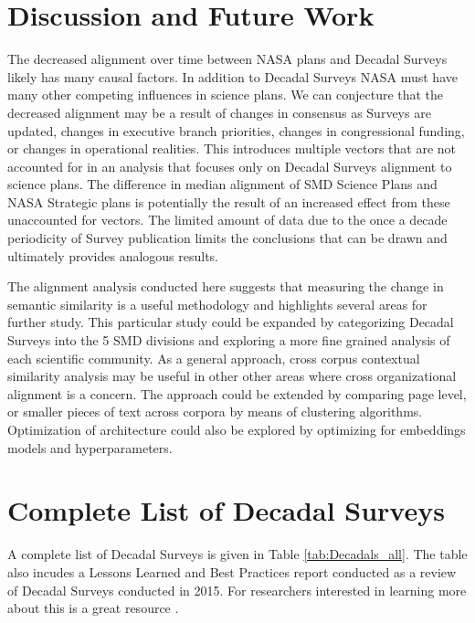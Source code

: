 \documentclass[preprint,12pt]{elsarticle}
\begin{document}
\section{Discussion and Future Work}
\label{discussion}

The decreased alignment over time between NASA plans and Decadal Surveys likely has many causal factors. In addition to Decadal Surveys NASA must have many other competing influences in science plans. We can conjecture that the decreased alignment may be a result of changes in consensus as Surveys are updated, changes in executive branch priorities, changes in congressional funding, or changes in operational realities. This introduces multiple vectors that are not accounted for in an analysis that focuses only on Decadal Surveys alignment to science plans. The difference in median alignment of SMD Science Plans and NASA Strategic plans is potentially the result of an increased effect from these unaccounted for vectors. The limited amount of data due to the once a decade periodicity of Survey publication limits the conclusions that can be drawn and ultimately provides analogous results. 

The alignment analysis conducted here suggests that measuring the change in semantic similarity is a useful methodology and highlights several areas for further study. This particular study could be expanded by categorizing Decadal Surveys into the 5 SMD divisions and exploring a more fine grained analysis of each scientific community. As a general approach, cross corpus contextual similarity analysis may be useful in other other areas where cross organizational alignment is a concern.  The approach could be extended by comparing page level, or smaller pieces of text across corpora by means of clustering algorithms. Optimization of architecture could also be explored by optimizing for embeddings models and hyperparameters.

\newpage 
\appendix
\section{Complete List of Decadal Surveys}
\label{app_Decadal_Surveys}
A complete list of Decadal Surveys is given in Table \ref{tab:Decadals_all}. The table also incudes a Lessons Learned and Best Practices report conducted as a review of Decadal Surveys conducted in 2015. For researchers interested in learning more about this is a great resource \cite{Academies2015_lessons}.
\end{document}

